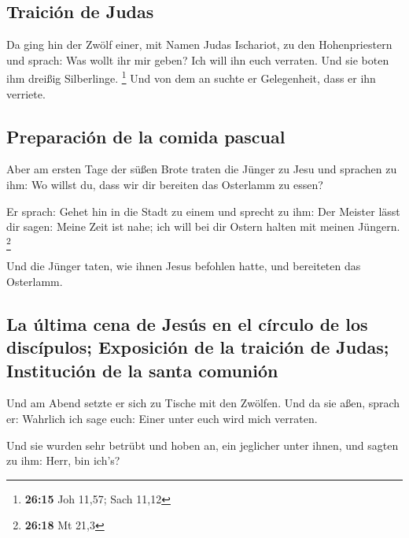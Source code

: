 \hypertarget{traiciuxf3n-de-judas}{%
\subsection{Traición de Judas}\label{traiciuxf3n-de-judas}}

 Da ging hin der Zwölf einer, mit Namen Judas Ischariot,
zu den Hohenpriestern  und sprach: Was wollt ihr mir
geben? Ich will ihn euch verraten. Und sie boten ihm dreißig
Silberlinge. \footnote{\textbf{26:15} Joh 11,57; Sach 11,12}
 Und von dem an suchte er Gelegenheit, dass er ihn
verriete.

\hypertarget{preparaciuxf3n-de-la-comida-pascual}{%
\subsection{Preparación de la comida
pascual}\label{preparaciuxf3n-de-la-comida-pascual}}

 Aber am ersten Tage der süßen Brote traten die Jünger zu
Jesu und sprachen zu ihm: Wo willst du, dass wir dir bereiten das
Osterlamm zu essen?

 Er sprach: Gehet hin in die Stadt zu einem und sprecht
zu ihm: Der Meister lässt dir sagen: Meine Zeit ist nahe; ich will bei
dir Ostern halten mit meinen Jüngern. \footnote{\textbf{26:18} Mt 21,3}

 Und die Jünger taten, wie ihnen Jesus befohlen hatte,
und bereiteten das Osterlamm.

\hypertarget{la-uxfaltima-cena-de-jesuxfas-en-el-cuxedrculo-de-los-discuxedpulos-exposiciuxf3n-de-la-traiciuxf3n-de-judas-instituciuxf3n-de-la-santa-comuniuxf3n}{%
\subsection{La última cena de Jesús en el círculo de los discípulos;
Exposición de la traición de Judas; Institución de la santa
comunión}\label{la-uxfaltima-cena-de-jesuxfas-en-el-cuxedrculo-de-los-discuxedpulos-exposiciuxf3n-de-la-traiciuxf3n-de-judas-instituciuxf3n-de-la-santa-comuniuxf3n}}

 Und am Abend setzte er sich zu Tische mit den Zwölfen.
 Und da sie aßen, sprach er: Wahrlich ich sage euch:
Einer unter euch wird mich verraten.

 Und sie wurden sehr betrübt und hoben an, ein jeglicher
unter ihnen, und sagten zu ihm: Herr, bin ich's?

